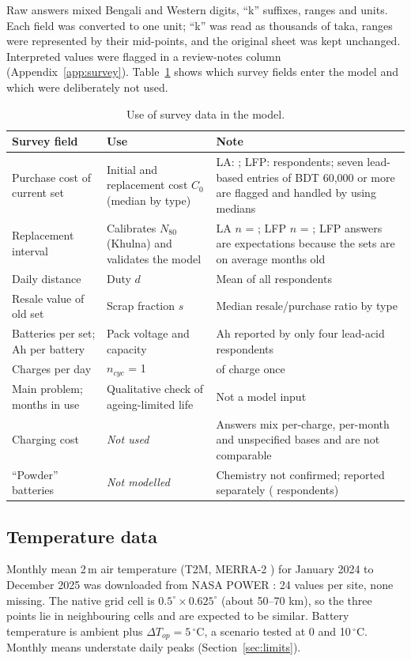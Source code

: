 Raw answers mixed Bengali and Western digits, ``k'' suffixes, ranges and units. Each field was converted to one unit; ``k'' was read as thousands of taka, ranges were represented by their mid-points, and the original sheet was kept unchanged. Interpreted values were flagged in a review-notes column (Appendix~\ref{app:survey}). Table~\ref{tab:use} shows which survey fields enter the model and which were deliberately not used.
\begin{table}[t]
\caption{Use of survey data in the model.}
\label{tab:use}
\centering\footnotesize
\renewcommand{\arraystretch}{1.1}
\begin{tabular}{p{3.6cm}p{5.0cm}p{6.0cm}}
\hline
Survey field & Use & Note \\
\hline
Purchase cost of current set & Initial and replacement cost $C_0$ (median by type) & LA: \nLA{}; LFP: \nLFP{} respondents; seven lead-based entries of BDT 60{,}000 or more are flagged and handled by using medians \\
Replacement interval & Calibrates $N_{80}$ (Khulna) and validates the model & LA $n$ = \replNLA{}; LFP $n$ = \replNLFP{}; LFP answers are expectations because the sets are on average \ageMeanLFP{} months old \\
Daily distance & Duty $d$ & Mean of all respondents \\
Resale value of old set & Scrap fraction $s$ & Median resale/purchase ratio by type \\
Batteries per set; Ah per battery & Pack voltage and capacity & Ah reported by only four lead-acid respondents \\
Charges per day & $n_{cyc}$ = 1 & \onePerDay{} of \nSurvey{} charge once \\
Main problem; months in use & Qualitative check of ageing-limited life & Not a model input \\
Charging cost & \emph{Not used} & Answers mix per-charge, per-month and unspecified bases and are not comparable \\
``Powder'' batteries & \emph{Not modelled} & Chemistry not confirmed; reported separately (\nPW{} respondents) \\
\hline
\end{tabular}
\end{table}

\subsection{Temperature data}
Monthly mean 2\,m air temperature (T2M, MERRA-2 \cite{gelaro2017}) for January 2024 to December 2025 was downloaded from NASA POWER \cite{nasa_power}: 24 values per site, none missing. The native grid cell is $0.5^\circ\times0.625^\circ$ (about 50--70 km), so the three points lie in neighbouring cells and are expected to be similar. Battery temperature is ambient plus $\Delta T_{op}=5\,^\circ$C, a scenario tested at 0 and 10\,$^\circ$C. Monthly means understate daily peaks (Section~\ref{sec:limits}).

